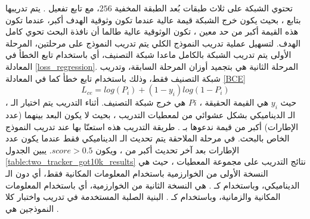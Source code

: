 تحتوي الشبكة على ثلاث طبقات
بُعد الطبقة المخفية $256$، مع تابع تفعيل 
.
\newline	
يتم تدريبها بتابع
،
بحيث يكون خرج الشبكة
قيمة عالية عندما تكون وثوقية الهدف أكبر، 
عندما تكون هذه القيمة أكبر من حد معين
،
تكون الوثوقية عالية طالما أن نافذة البحث تحوي كامل الهدف.
\newline
لتسهيل عملية تدريب النموذج الكلي
يتم تدريب النموذج على مرحلتين،
المرحلة الأولى يتم تدريب الشبكة بالكامل ماعدا شبكة التصنيف،
أي باستخدام تابع الخطأ في المعادلة
\ref{loss_regression}.
المرحلة الثانية هي بتجميد أوزان المرحلة السابقة، وتدريب شبكة التصنيف
فقط، وذلك باستخدام تابع خطأ
كما في المعادلة
\ref{BCE}
\begin{equation}
	L_{ce} = log(P_i) + (1-y_i)log(1-P_i)
	\label{BCE}
\end{equation}
حيث
$y_i$
هي القيمة الحقيقة
،
$Pi$
هي خرج شبكة التصنيف.
\newline
أثناء التدريب يتم اختيار الـ
،
الـ
الديناميكي
بشكل عشوائي من
لمعطيات التدريب
،
بحيث لا يكون البعد بينهما (عدد الإطارات) أكبر من قيمة ندعوها بـ
.
طريقة التدريب هذه استعنّا بها عند تدريب النموذج الخاص بالبحث.
\newline
في مرحلة الملاحقة يتم تحديث الـ
 الديناميكي فقط عندما يكون عدد الإطارات بعد آخر تحديث أكبر من  
،
ويكون
$score > 0.5$.
\newline
يبين الجدول 
\ref{table:two_tracker_got10k_results}
نتائج التدريب على مجموعة المعطيات
،
حيث
 هي النسخة الأولى من الخوارزمية باستخدام المعلومات المكانية فقط، أي دون الـ
 الديناميكي، وباستخدام 
 كـ
.
\newline
{}
 هي النسخة الثانية من الخوارزمية، أي باستخدام المعلومات المكانية والزمانية، وباستخدام
 كـ
.
\newline
البنية الصلبة المستخدمة في تدريب واختبار كلا النموذجين هي
.
\newline
{}
